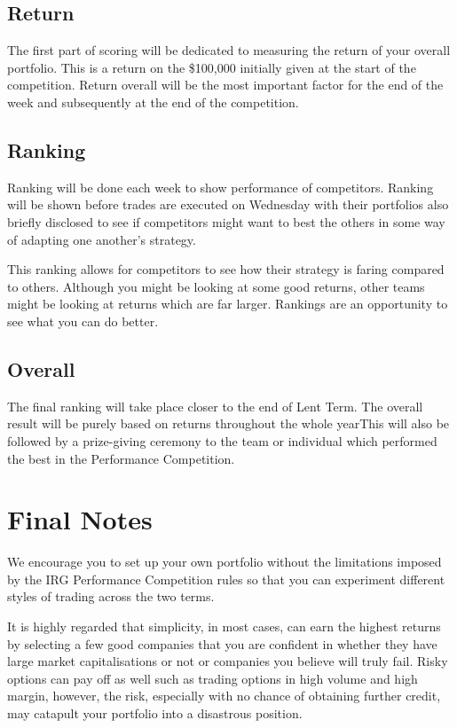 \documentclass[a4paper]{article}
\begin{document}
{\subsection{Return}
The first part of scoring will be dedicated to measuring the return of your overall portfolio. This is a return on the \$100,000 initially given at the start of the competition. Return overall will be the most important factor for the end of the week and subsequently at the end of the competition.

\subsection{Ranking}
Ranking will be done each week to show performance of competitors. Ranking will be shown before trades are executed on Wednesday with their portfolios also briefly disclosed to see if competitors might want to best the others in some way of adapting one another's strategy.

\vspace{10pt}
\noindent This ranking allows for competitors to see how their strategy is faring compared to others. Although you might be looking at some good returns, other teams might be looking at returns which are far larger. Rankings are an opportunity to see what you can do better.

\subsection{Overall}
The final ranking will take place closer to the end of Lent Term. The overall result will be purely based on returns throughout the whole yearThis will also be followed by a prize-giving ceremony to the team or individual which performed the best in the Performance Competition.

\newpage
\section{Final Notes}
We encourage you to set up your own portfolio without the limitations imposed by the IRG Performance Competition rules so that you can experiment different styles of trading across the two terms.

\vspace{10pt}
\noindent It is highly regarded that simplicity, in most cases, can earn the highest returns by selecting a few good companies that you are confident in whether they have large market capitalisations or not or companies you believe will truly fail. Risky options can pay off as well such as trading options in high volume and high margin, however, the risk, especially with no chance of obtaining further credit, may catapult your portfolio into a disastrous position.

}
\end{document}
